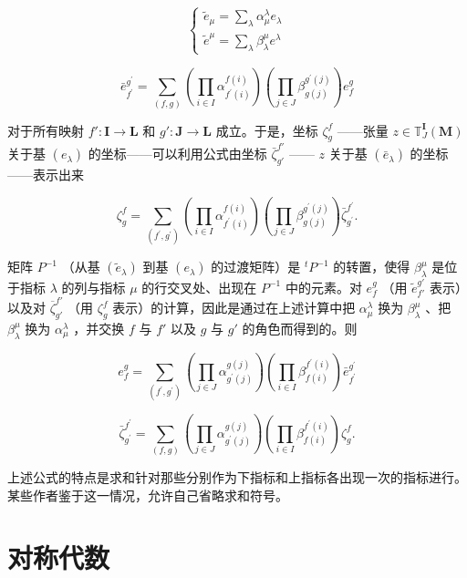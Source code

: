 \[
\left\{ \begin{array}{l} \tilde {e} _ {\mu} = \sum_ {\lambda} \alpha_ {\mu} ^ {\lambda} e _ {\lambda} \\ \tilde {e} ^ {\mu} = \sum_ {\lambda} \beta_ {\lambda} ^ {\mu} e ^ {\lambda} \end{array} \right.\tag{20}
\]

\[
\bar {e} _ {f ^ {\prime}} ^ {g ^ {\prime}} = \sum_ {(f, g)} \left(\prod_ {i \in I} \alpha_ {f ^ {\prime} (i)} ^ {f (i)}\right) \left(\prod_ {j \in J} \beta_ {g (j)} ^ {g ^ {\prime} (j)}\right) e _ {f} ^ {g}
\]

对于所有映射 \(f': \mathbf{I} \to \mathbf{L}\) 和 \(g': \mathbf{J} \to \mathbf{L}\) 成立。于是，坐标 \(\zeta_g^f\) ——张量 \(z \in \mathbb{T}_J^{\mathbf{I}}(\mathbf{M})\) 关于基 \((e_{\lambda})\) 的坐标——可以利用公式由坐标 \(\bar{\zeta}_{g'}^{f'}\) —— \(z\) 关于基 \((\bar{e}_{\lambda})\) 的坐标——表示出来

\[
\zeta_ {g} ^ {f} = \sum_ {(f ^ {\prime}, g ^ {\prime})} \left(\prod_ {i \in I} \alpha_ {f ^ {\prime} (i)} ^ {f (i)}\right) \left(\prod_ {j \in J} \beta_ {g (j)} ^ {g ^ {\prime} (j)}\right) \bar {\zeta} _ {g ^ {\prime}} ^ {f ^ {\prime}}.\tag{21}
\]

矩阵 \(P^{-1}\) （从基 \((\tilde{e}_{\lambda})\) 到基 \((e_{\lambda})\) 的过渡矩阵）是 \(^{t}P^{-1}\) 的转置，使得 \(\beta_{\lambda}^{\mu}\) 是位于指标 \(\lambda\) 的列与指标 \(\mu\) 的行交叉处、出现在 \(P^{-1}\) 中的元素。对 \(e_{f}^{g}\) （用 \(\tilde{e}_{f'}^{g'}\) 表示）以及对 \(\overline{\zeta}_{g'}^{f'}\) （用 \(\zeta_{g}^{f}\) 表示）的计算，因此是通过在上述计算中把 \(\alpha_{\mu}^{\lambda}\) 换为 \(\beta_{\lambda}^{\mu}\) 、把 \(\beta_{\lambda}^{\mu}\) 换为 \(\alpha_{\mu}^{\lambda}\) ，并交换 \(f\) 与 \(f'\) 以及 \(g\) 与 \(g'\) 的角色而得到的。则

\[
e _ {f} ^ {g} = \sum_ {(f ^ {\prime}, g ^ {\prime})} \left(\prod_ {j \in J} \alpha_ {g ^ {\prime} (j)} ^ {g (j)}\right) \left(\prod_ {i \in I} \beta_ {f (i)} ^ {f ^ {\prime} (i)}\right) \bar {e} _ {f ^ {\prime}} ^ {g ^ {\prime}}\tag{22}
\]

\[
\bar {\zeta} _ {g ^ {\prime}} ^ {f ^ {\prime}} = \sum_ {(f, g)} \left(\prod_ {j \in J} \alpha_ {g ^ {\prime} (j)} ^ {g (j)}\right) \left(\prod_ {i \in I} \beta_ {f (i)} ^ {f ^ {\prime} (i)}\right) \zeta_ {g} ^ {f}.\tag{23}
\]

上述公式的特点是求和针对那些分别作为下指标和上指标各出现一次的指标进行。某些作者鉴于这一情况，允许自己省略求和符号。

\section{对称代数}

